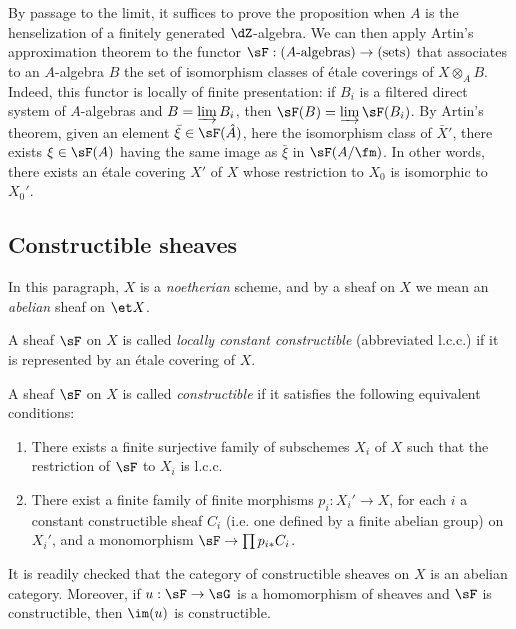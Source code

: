 \documentclass[oneside]{book}
\begin{document}
By passage to the limit, it suffices to prove the proposition when $A$ is
the henselization of a finitely generated $\dZ$-algebra. We can then
apply Artin's approximation theorem to the functor
$\sF:(\textnormal{$A$-algebras})\to(\textnormal{sets})$ that associates
to an $A$-algebra $B$ the set of isomorphism classes of étale coverings
of $X\otimes_AB$. Indeed, this functor is locally of finite presentation:
if $B_i$ is a filtered direct system of $A$-algebras and
$B=\varinjlim B_i$, then $\sF(B)=\varinjlim\sF(B_i)$. By Artin's
theorem, given an element $\bar\xi\in\sF(\hat A)$, here the isomorphism class
of $\bar X'$, there exists $\xi\in\sF(A)$ having the same image as
$\bar\xi$ in $\sF(A/\fm)$. In other words, there exists an étale
covering $X'$ of $X$ whose restriction to $X_0$ is isomorphic to
$X_0'$.

\subsection{Constructible sheaves}\label{I:4-3}

In this paragraph, $X$ is a \emph{noetherian} scheme, and by a sheaf on
$X$ we mean an \emph{abelian} sheaf on $\et X$.

\begin{definition}\label{I:4-3-1}
A sheaf $\sF$ on $X$ is called \emph{locally constant constructible}
(abbreviated l.c.c.) if it is represented by an étale covering of $X$.
\end{definition}

\begin{definition}\label{I:4-3-2}
A sheaf $\sF$ on $X$ is called \emph{constructible} if it satisfies the
following equivalent conditions:
\begin{enumerate}[\indent (i)]
  \item There exists a finite surjective family of subschemes $X_i$ of
    $X$ such that the restriction of $\sF$ to $X_i$ is l.c.c.
  \item There exist a finite family of finite morphisms $p_i:X_i'\to X$,
    for each $i$ a constant constructible sheaf $C_i$ (i.e. one defined
    by a finite abelian group) on $X_i'$, and a monomorphism
    $\sF\to\prod p_{i*}C_i$.
\end{enumerate}
\end{definition}

It is readily checked that the category of constructible sheaves on $X$
is an abelian category. Moreover, if $u:\sF\to\sG$ is a homomorphism of
sheaves and $\sF$ is constructible, then $\im(u)$ is constructible.
\end{document}
